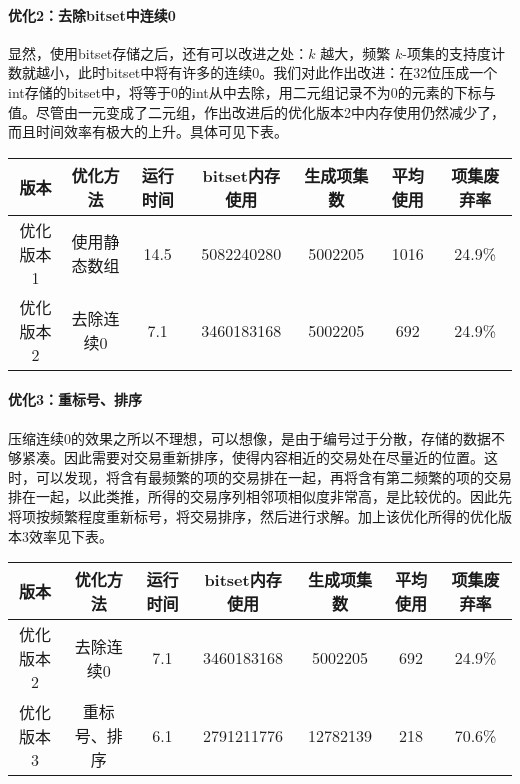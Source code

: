 \documentclass[a4paper,9pt]{article}
\begin{document}
\paragraph{优化2：去除bitset中连续0}
显然，使用bitset存储之后，还有可以改进之处：$k$ 越大，频繁 $k$-项集的支持度计数就越小，此时bitset中将有许多的连续0。我们对此作出改进：在32位压成一个int存储的bitset中，将等于0的int从中去除，用二元组记录不为0的元素的下标与值。尽管由一元变成了二元组，作出改进后的优化版本2中内存使用仍然减少了，而且时间效率有极大的上升。具体可见下表。
\begin{center}
	\begin{tabular}{ccccccc}
		版本&优化方法&运行时间&bitset内存使用&生成项集数&平均使用&项集废弃率\\\hline
		优化版本1&使用静态数组&14.5&5082240280&5002205&1016&24.9\%\\
		优化版本2&去除连续0&7.1&3460183168&5002205&692&24.9\%
	\end{tabular}
\end{center}

\paragraph{优化3：重标号、排序}
压缩连续0的效果之所以不理想，可以想像，是由于编号过于分散，存储的数据不够紧凑。因此需要对交易重新排序，使得内容相近的交易处在尽量近的位置。这时，可以发现，将含有最频繁的项的交易排在一起，再将含有第二频繁的项的交易排在一起，以此类推，所得的交易序列相邻项相似度非常高，是比较优的。因此先将项按频繁程度重新标号，将交易排序，然后进行求解。加上该优化所得的优化版本3效率见下表。
\begin{center}
	\begin{tabular}{ccccccc}
		版本&优化方法&运行时间&bitset内存使用&生成项集数&平均使用&项集废弃率\\\hline
		优化版本2&去除连续0&7.1&3460183168&5002205&692&24.9\%\\
		优化版本3&重标号、排序&6.1&2791211776&12782139&218&70.6\%
	\end{tabular}
\end{center}
\end{document}
